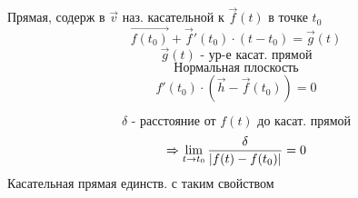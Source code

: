 \documentclass[12pt, fleqn]{article}
\begin{document}
\begin{definition}
	Прямая, содерж в $\vec{v}$ наз. касательной к $\vec{f}(t)$ в точке $t_0$
	\[\vec{f(t_0)} + \vec{f}'(t_0) \cdot (t - t_0) = \vec{g}(t)\]
	\[\vec{g}(t) \text{ - ур-е касат. прямой}\]
	\[\text{Нормальная плоскость}\]
	\[f'(t_0) \cdot (\vec{h} - \vec{f}(t_0)) = 0\]
\end{definition}

\begin{Theorem}
	\[\delta \text{ - расстояние от }f(t) \text{ до касат. прямой}\]
	\[\Rightarrow \lim_{t \to t_0} \frac{\delta}{|f(t) - f(t_0)|} = 0 \]
	Касательная прямая единств. с таким свойством
\end{Theorem}

\begin{Proof}
		
\end{Proof}
\end{document}
